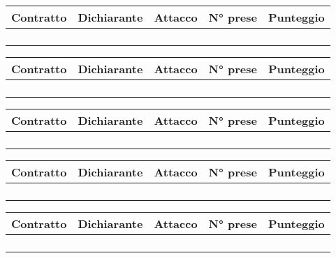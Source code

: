 \documentclass[a4paper, fontsize=20.74pt]{scrreprt}
\begin{document}
\begin{tabular}{||c|c|c|c|c||}
    \hline
    Contratto\hspace{2cm} & Dichiarante & Attacco & N° prese & Punteggio \\
    \hline
              &&&&\\
    \hline
              &&&&\\
    \hline
              &&&&\\
    \hline
              &&&&\\
    \hline
    \end{tabular}
\medskip

\begin{tabular}{||c|c|c|c|c||}
    \hline
    Contratto\hspace{2cm} & Dichiarante & Attacco & N° prese & Punteggio \\
    \hline
              &&&&\\
    \hline
              &&&&\\
    \hline
              &&&&\\
    \hline
              &&&&\\
    \hline
    \end{tabular}
\medskip

\begin{tabular}{||c|c|c|c|c||}
    \hline
    Contratto\hspace{2cm} & Dichiarante & Attacco & N° prese & Punteggio \\
    \hline
              &&&&\\
    \hline
              &&&&\\
    \hline
              &&&&\\
    \hline
              &&&&\\
    \hline
    \end{tabular}
\medskip

\begin{tabular}{||c|c|c|c|c||}
    \hline
    Contratto\hspace{2cm} & Dichiarante & Attacco & N° prese & Punteggio \\
    \hline
              &&&&\\
    \hline
              &&&&\\
    \hline
              &&&&\\
    \hline
              &&&&\\
    \hline
    \end{tabular}
\medskip

\begin{tabular}{||c|c|c|c|c||}
    \hline
    Contratto\hspace{2cm} & Dichiarante & Attacco & N° prese & Punteggio \\
    \hline
              &&&&\\
    \hline
              &&&&\\
    \hline
              &&&&\\
    \hline
              &&&&\\
    \hline
    \end{tabular}
\medskip
\end{document}
